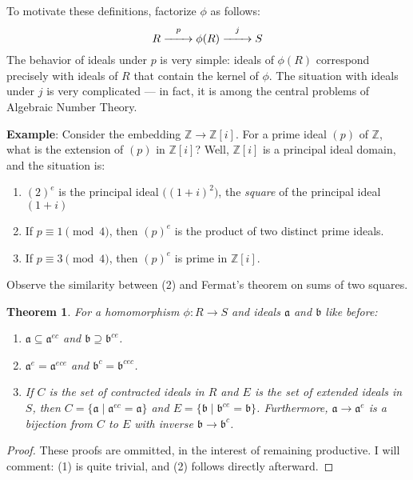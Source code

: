 \documentclass[11pt]{article}
\newtheorem{theorem}{Theorem}
\renewcommand{\longrightarrow}{\xrightarrow{\hspace*{0.7cm}}}
\begin{document}
To motivate these definitions, factorize $\phi$ as follows:
\[
	R \stackrel{p}{\longrightarrow}\phi(R) \stackrel{j}{\longrightarrow} S
\]
The behavior of ideals under $p$ is very simple: ideals of $\phi(R)$ correspond precisely with ideals of $R$ that contain the kernel of $\phi$. The situation with ideals under $j$ is very complicated --- in fact, it is among the central problems of Algebraic Number Theory.

\textbf{Example}: Consider the embedding $\mathbb{Z} \to \mathbb{Z}[i]$. For a prime ideal $(p)$ of $\mathbb{Z}$, what is the extension of $(p)$ in $\mathbb{Z}[i]$? Well, $\mathbb{Z}[i]$ is a principal ideal domain, and the situation is:
\begin{enumerate}
	\item $(2)^{e}$ is the principal ideal $\Big( (1 + i)^{2} \Big)$, the \textit{square} of the principal ideal $(1 + i)$
	\item If $p \equiv 1 \pmod{4}$, then $(p)^{e}$ is the product of two distinct prime ideals.
	\item If $p \equiv 3 \pmod{4}$, then $(p)^{e}$ is prime in $\mathbb{Z}[i]$.
\end{enumerate}
Observe the similarity between (2) and Fermat's theorem on sums of two squares.

\begin{adjustwidth}{0.5cm}{}
	\begin{theorem}
		For a homomorphism $\phi : R \to S$ and ideals $\mathfrak{a}$ and $\mathfrak{b}$ like before:
		\begin{enumerate}
			\item $\mathfrak{a} \subseteq \mathfrak{a}^{ec}$ and $\mathfrak{b} \supseteq \mathfrak{b}^{ce}$.
			\item $\mathfrak{a}^{e} = \mathfrak{a}^{ece}$ and $\mathfrak{b}^{c} = \mathfrak{b}^{cec}$.
			\item If $C$ is the set of contracted ideals in $R$ and $E$ is the set of extended ideals in $S$, then $C = \{ \mathfrak{a} \mid \mathfrak{a}^{ec} = \mathfrak{a} \}$ and $E = \{ \mathfrak{b} \mid \mathfrak{b}^{ce} = \mathfrak{b} \}$. Furthermore, $\mathfrak{a} \to \mathfrak{a}^{e}$ is a bijection from $C$ to $E$ with inverse $\mathfrak{b} \to \mathfrak{b}^{c}$.
		\end{enumerate}
	\end{theorem}
	\begin{proof}
		These proofs are ommitted, in the interest of remaining productive. I will comment: (1) is quite trivial, and (2) follows directly afterward.
	\end{proof}
\end{adjustwidth}
\end{document}
